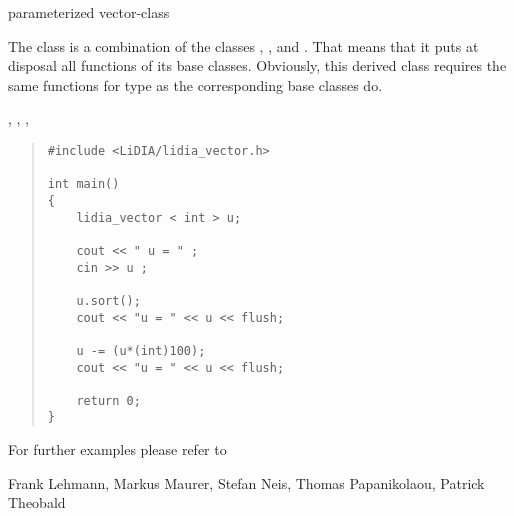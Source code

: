 

\NAME

 \dotfill parameterized vector-class



\DESCRIPTION

The class  is a combination of the classes ,
, and .  That means that it puts at disposal all functions
of its base classes.  Obviously, this derived class requires the same functions for type
 as the corresponding base classes do.



\SEEALSO

, ,
, 



\EXAMPLES

\begin{quote}
\begin{verbatim}
#include <LiDIA/lidia_vector.h>

int main()
{
    lidia_vector < int > u;

    cout << " u = " ;
    cin >> u ;

    u.sort();
    cout << "u = " << u << flush;

    u -= (u*(int)100);
    cout << "u = " << u << flush;

    return 0;
}
\end{verbatim}
\end{quote}

For further examples please refer to 



\AUTHOR

Frank Lehmann, Markus Maurer, Stefan Neis, Thomas Papanikolaou, Patrick Theobald

